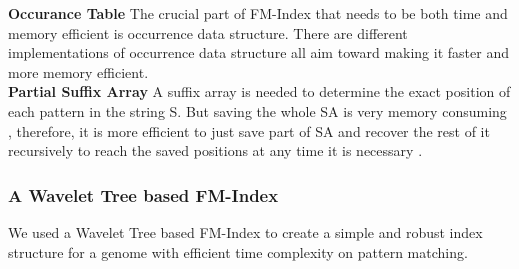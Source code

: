 \documentclass[11pt,a4paper]{report}
\begin{document}
\textbf{Occurance Table} The crucial part of FM-Index that needs to be 
both time and memory efficient is occurrence data structure\cite{Wavthesis}.
There are different implementations of occurrence data structure all aim toward making it faster and more memory efficient.
\\

\textbf{Partial Suffix Array} A suffix array is needed to determine the exact position of each pattern in the string S.
But saving the whole SA is very memory consuming , therefore,
it is more efficient to just save part of SA and recover the rest
of it recursively to reach the saved positions at any time it is necessary \cite{Wavthesis}.\\



\subsubsection{A Wavelet Tree based FM-Index} \label{A Wavelet Tree based FM-Index}

We used a Wavelet Tree based FM-Index to create a simple and robust index structure for 
a genome with efficient time complexity on pattern matching.\\

\end{document}
